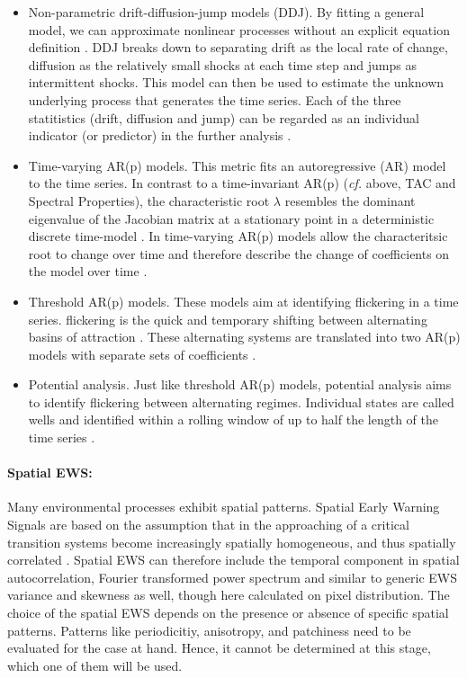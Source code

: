 \begin{itemize}
	\item Non-parametric drift-diffusion-jump models (DDJ). By fitting a general model, we can approximate nonlinear processes without an explicit equation definition \citep{carpenter2011b}. DDJ breaks down to separating drift as the local rate of change, diffusion as the relatively small shocks at each time step and jumps as intermittent shocks. This model can then be used to estimate the unknown underlying process that generates the time series. Each of the three statitistics (drift, diffusion and jump) can be regarded as an individual indicator (or predictor) in the further analysis \citep{dakos2012}. %
	\item Time-varying AR(p) models. This metric fits an autoregressive (AR) model to the time series. In contrast to a time-invariant AR(p) (\textit{cf.} above, TAC and Spectral Properties), the characteristic root $\lambda$ resembles the dominant eigenvalue of the Jacobian matrix at a stationary point in a deterministic discrete time-model \citep{held2004}. In time-varying AR(p) models allow the characteritsic root to change over time and therefore describe the change of coefficients on the model over time \citep{ives2012}.
	\item Threshold AR(p) models. These models aim at identifying \gls{flickering} in a time series. \Gls{flickering} is the quick and temporary shifting between alternating basins of attraction \citep{scheffer2009b}. These alternating systems are translated into two AR(p) models with separate sets of coefficients \citep{ives2012}.
	\item Potential analysis. Just like threshold AR(p) models, potential analysis aims to identify \gls{flickering} between alternating regimes. Individual states are called wells and identified within a rolling window of up to half the length of the time series \citep{livina2010}.
\end{itemize}

\paragraph{Spatial EWS:}
Many environmental processes exhibit spatial patterns. Spatial Early Warning Signals are based on the assumption that in the approaching of a critical transition systems become increasingly spatially homogeneous, and thus spatially correlated \citep{kefi2014}. Spatial EWS can therefore include the temporal component in spatial autocorrelation, Fourier transformed power spectrum and similar to generic EWS variance and skewness as well, though here calculated on pixel distribution. The choice of the spatial EWS depends on the presence or absence of specific spatial patterns. Patterns like periodicitiy, anisotropy, and patchiness need to be evaluated for the case at hand. Hence, it cannot be determined at this stage, which one of them will be used.




